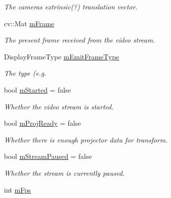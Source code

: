 \begin{DoxyCompactItemize}
\begin{DoxyCompactList}\small\item\em The camera\textquotesingle{}s extrinsic(?) translation vector. \end{DoxyCompactList}\item 
cv\+::\+Mat \hyperlink{classTrackingStream_ab20d8ac03883d092c20c77dcbea3b71c}{m\+Frame}\hypertarget{classTrackingStream_ab20d8ac03883d092c20c77dcbea3b71c}{}\label{classTrackingStream_ab20d8ac03883d092c20c77dcbea3b71c}

\begin{DoxyCompactList}\small\item\em The present frame received from the video stream. \end{DoxyCompactList}\item 
Display\+Frame\+Type \hyperlink{classTrackingStream_ac9116756f01fbf7939da2f898d943dca}{m\+Emit\+Frame\+Type}
\begin{DoxyCompactList}\small\item\em The type (e.\+g. \end{DoxyCompactList}\item 
bool \hyperlink{classTrackingStream_a45ee0e595bf16621e254870f04626f62}{m\+Started} = false\hypertarget{classTrackingStream_a45ee0e595bf16621e254870f04626f62}{}\label{classTrackingStream_a45ee0e595bf16621e254870f04626f62}

\begin{DoxyCompactList}\small\item\em Whether the video stream is started. \end{DoxyCompactList}\item 
bool \hyperlink{classTrackingStream_a93a3ab3b1ca5f47616ac994daf33e217}{m\+Proj\+Ready} = false\hypertarget{classTrackingStream_a93a3ab3b1ca5f47616ac994daf33e217}{}\label{classTrackingStream_a93a3ab3b1ca5f47616ac994daf33e217}

\begin{DoxyCompactList}\small\item\em Whether there is enough projector data for transform. \end{DoxyCompactList}\item 
bool \hyperlink{classTrackingStream_a0232a7a768a35361f7df331e957a8dc0}{m\+Stream\+Paused} = false\hypertarget{classTrackingStream_a0232a7a768a35361f7df331e957a8dc0}{}\label{classTrackingStream_a0232a7a768a35361f7df331e957a8dc0}

\begin{DoxyCompactList}\small\item\em Whether the stream is currently paused. \end{DoxyCompactList}\item 
int \hyperlink{classTrackingStream_a684530788cdc39f33758ec2590392429}{m\+Fps}\hypertarget{classTrackingStream_a684530788cdc39f33758ec2590392429}{}\label{classTrackingStream_a684530788cdc39f33758ec2590392429}


\end{DoxyCompactItemize}
